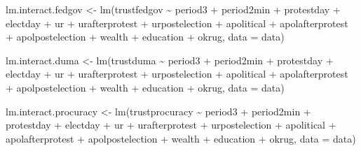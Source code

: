 \documentclass[
  letterpaper,
  DIV=11,
  numbers=noendperiod]{scrartcl}
\newenvironment{Shaded}{\begin{snugshade}}{\end{snugshade}}
\newcommand{\AttributeTok}[1]{\textcolor[rgb]{0.40,0.45,0.13}{#1}}
\newcommand{\FunctionTok}[1]{\textcolor[rgb]{0.28,0.35,0.67}{#1}}
\newcommand{\NormalTok}[1]{\textcolor[rgb]{0.00,0.23,0.31}{#1}}
\newcommand{\OtherTok}[1]{\textcolor[rgb]{0.00,0.23,0.31}{#1}}
\newcommand{\SpecialCharTok}[1]{\textcolor[rgb]{0.37,0.37,0.37}{#1}}
\begin{document}
\begin{Shaded}
\begin{Highlighting}[]
\NormalTok{lm.interact.fedgov }\OtherTok{\textless{}{-}} \FunctionTok{lm}\NormalTok{(trustfedgov }\SpecialCharTok{\textasciitilde{}}\NormalTok{ period3 }\SpecialCharTok{+}\NormalTok{ period2min }\SpecialCharTok{+}\NormalTok{ protestday }\SpecialCharTok{+}\NormalTok{ electday }\SpecialCharTok{+} 
\NormalTok{                                ur }\SpecialCharTok{+}\NormalTok{ urafterprotest }\SpecialCharTok{+}\NormalTok{ urpostelection }\SpecialCharTok{+} 
\NormalTok{                                apolitical }\SpecialCharTok{+}\NormalTok{ apolafterprotest }\SpecialCharTok{+}\NormalTok{ apolpostelection }\SpecialCharTok{+}
\NormalTok{                                wealth }\SpecialCharTok{+}\NormalTok{ education }\SpecialCharTok{+}\NormalTok{ okrug, }\AttributeTok{data =}\NormalTok{ data) }

\NormalTok{lm.interact.duma }\OtherTok{\textless{}{-}} \FunctionTok{lm}\NormalTok{(trustduma }\SpecialCharTok{\textasciitilde{}}\NormalTok{ period3 }\SpecialCharTok{+}\NormalTok{ period2min }\SpecialCharTok{+}\NormalTok{ protestday }\SpecialCharTok{+}\NormalTok{ electday }\SpecialCharTok{+} 
\NormalTok{                                ur }\SpecialCharTok{+}\NormalTok{ urafterprotest }\SpecialCharTok{+}\NormalTok{ urpostelection }\SpecialCharTok{+} 
\NormalTok{                                apolitical }\SpecialCharTok{+}\NormalTok{ apolafterprotest }\SpecialCharTok{+}\NormalTok{ apolpostelection }\SpecialCharTok{+}
\NormalTok{                                wealth }\SpecialCharTok{+}\NormalTok{ education }\SpecialCharTok{+}\NormalTok{ okrug, }\AttributeTok{data =}\NormalTok{ data) }

\NormalTok{lm.interact.procuracy }\OtherTok{\textless{}{-}} \FunctionTok{lm}\NormalTok{(trustprocuracy }\SpecialCharTok{\textasciitilde{}}\NormalTok{ period3 }\SpecialCharTok{+}\NormalTok{ period2min }\SpecialCharTok{+}\NormalTok{ protestday }\SpecialCharTok{+}\NormalTok{ electday }\SpecialCharTok{+} 
\NormalTok{                                ur }\SpecialCharTok{+}\NormalTok{ urafterprotest }\SpecialCharTok{+}\NormalTok{ urpostelection }\SpecialCharTok{+} 
\NormalTok{                                apolitical }\SpecialCharTok{+}\NormalTok{ apolafterprotest }\SpecialCharTok{+}\NormalTok{ apolpostelection }\SpecialCharTok{+}
\NormalTok{                                wealth }\SpecialCharTok{+}\NormalTok{ education }\SpecialCharTok{+}\NormalTok{ okrug, }\AttributeTok{data =}\NormalTok{ data) }


\end{Highlighting}
\end{Shaded}
\end{document}
